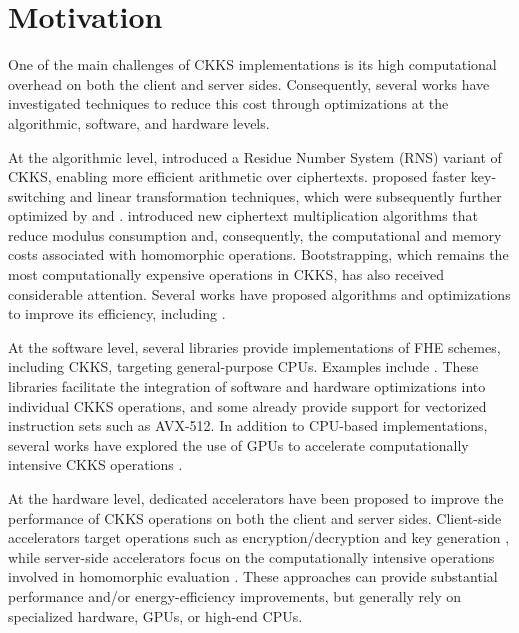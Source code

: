 \section{Motivation}

One of the main challenges of CKKS implementations is its high computational overhead on both the client and server sides. Consequently, several works have investigated techniques to reduce this cost through optimizations at the algorithmic, software, and hardware levels.

At the algorithmic level, \cite{cheon2018full} introduced a Residue Number System (RNS) variant of CKKS, enabling more efficient arithmetic over ciphertexts. \cite{halevi2018faster} proposed faster key-switching and linear transformation techniques, which were subsequently further optimized by \cite{bossuat2021efficient} and \cite{yan2026faster}. \cite{cheon2023homomorphic} introduced new ciphertext multiplication algorithms that reduce modulus consumption and, consequently, the computational and memory costs associated with homomorphic operations. Bootstrapping, which remains the most computationally expensive operations in CKKS, has also received considerable attention. Several works have proposed algorithms and optimizations to improve its efficiency, including \cite{cheon2018bootstrapping,chen2019improved,cheon2018faster,kim2022evalround,sung2025evalround+,cheon2025ship,kim2025overmodraise}.

At the software level, several libraries provide implementations of FHE schemes, including CKKS, targeting general-purpose CPUs. Examples include \cite{al2022openfhe,sealcrypto,boemer2021intel,jung2021accelerating,halevi2014algorithms}. These libraries facilitate the integration of software and hardware optimizations into individual CKKS operations, and some already provide support for vectorized instruction sets such as AVX-512. In addition to CPU-based implementations, several works have explored the use of GPUs to accelerate computationally intensive CKKS operations \cite{wang2025chameleon,wang2023he,chen2026hi}.

At the hardware level, dedicated accelerators have been proposed to improve the performance of CKKS operations on both the client and server sides. Client-side accelerators target operations such as encryption/decryption and key generation \cite{yune2025abc,wang2024compact,azad2023rise,krieger2024aloha}, while server-side accelerators focus on the computationally intensive operations involved in homomorphic evaluation \cite{fan2025fast,kim2022ark,kim2023sharp,putra2023strix}. These approaches can provide substantial performance and/or energy-efficiency improvements, but generally rely on specialized hardware, GPUs, or high-end CPUs.

